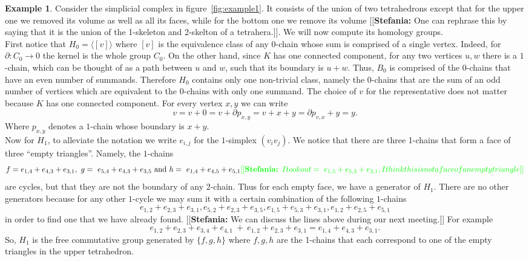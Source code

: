 \documentclass{article}
\newcommand{\ste}[1]{{\color{green}[[\textbf{Stefania: }#1]]}}
\theoremstyle{plain}
\theoremstyle{definition}
\newtheorem{example}[thm]{Example}
\theoremstyle{remark}
\begin{document}
\begin{example}
Consider the simplicial complex in figure~\ref{fig:example1}. It consists of the union of two tetrahedrons except that for the upper one we removed its volume as well as all its faces, while for the bottom one we remove its volume \ste{One can rephrase this by saying that it is the union of the 1-skeleton and 2-skelton of a tetrahera.}.
We will now compute its homology groups. \\ First notice that $H_0 = \langle [v] \rangle $ where $[v]$ is the equivalence class of any $0$-chain whose sum is comprised of a single vertex. Indeed, for $\partial: C_0 \to 0$ the kernel is the whole group $C_0$. On the other hand, since $K$ has one connected component, for any two vertices $u,w$ there is a $1$-chain, which can be thought of as a path between $u$ and $w$, such that its boundary is $u+w$. Thus, $B_0$ is comprised of the $0$-chains that have an even number of summands. Therefore $H_0$ contains only one non-trivial class, namely the $0$-chains that are the sum of an odd number of vertices which are equivalent to the $0$-chains with only one summand. The choice of $v$ for the representative does not matter because $K$ has one connected component. For every vertex $x,y$ we can write 
\[v = v+0 = v + \partial p_{x,y} = v + x + y = \partial p_{v,x} + y = y.  \] Where $p_{x,y}$ denotes a $1$-chain whose boundary is $x+y$. \\
Now for $H_1$, to alleviate the notation we write $e_{i,j}$ for the $1$-simplex $(v_iv_j)$. We notice that there are three 1-chains that form a face of three  “empty triangles”. Namely, the $1$-chains \[f= e_{1,4} + e_{4,3} + e_{3,1},\ g=\ e_{5,4} + e_{4,3} + e_{3,5} \text{ and } h=\ e_{1,4} + e_{4,5} + e_{5,1} \ste{I took out =\ e_{1,5} + e_{5,3} + e_{3,1}, I think this is not a face of an empty triangle}\] are cycles, but that they are not the boundary of any 2-chain. Thus for each empty face, we have a generator of $H_1$. There are no other generators because for any other $1$-cycle we may sum it with a certain combination of the following $1$-chains \[ e_{1,2} + e_{2,3} + e_{3,1}, e_{5,2} + e_{2,3} + e_{3,5}, e_{1,5} + e_{5,3} + e_{3,1}, e_{1,2} + e_{2,5} + e_{5,1} \]  in order to find one that we have already found. \ste{We can discuss the lines above during our next meeting.} For example
\[ e_{1,2} + e_{2,3} + e_{3,4} + e_{4,1} \ + \ e_{1,2} + e_{2,3} + e_{3,1} = e_{1,4} + e_{4,3} + e_{3,1} .\] So, $H_1$ is the free commutative group generated by $\{f,g,h\}$ where $f,g,h$ are the 1-chains that each correspond to one of the empty triangles in the upper tetrahedron. \\

\end{example}
\end{document}
